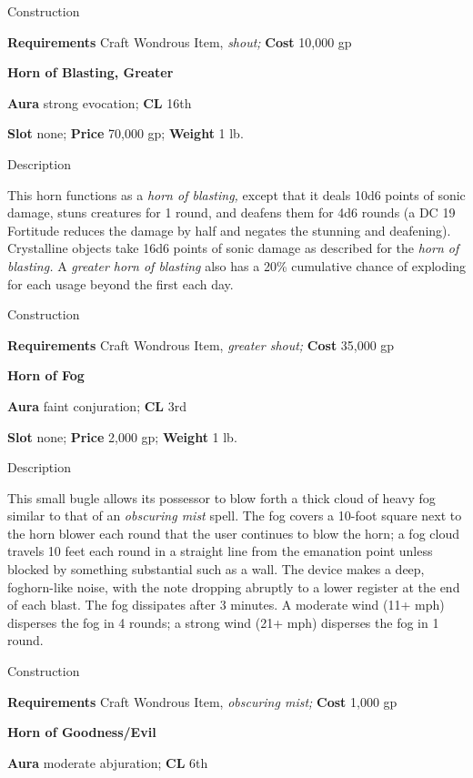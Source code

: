 Construction
				
\textbf{Requirements} Craft Wondrous Item,\textit{ shout;}\textbf{ Cost }10,000 gp
				
\textbf{Horn of Blasting, Greater}
				
\textbf{Aura} strong evocation;\textbf{ CL }16th
				
\textbf{Slot} none; \textbf{Price} 70,000 gp; \textbf{Weight} 1 lb.
				
Description
				
This horn functions as a \textit{horn of blasting,} except that it deals 10d6 points of sonic damage, stuns creatures for 1 round, and deafens them for 4d6 rounds (a DC 19 Fortitude reduces the damage by half and negates the stunning and deafening). Crystalline objects take 16d6 points of sonic damage as described for the \textit{horn of blasting.} A \textit{greater horn of blasting} also has a 20\% cumulative chance of exploding for each usage beyond the first each day. 
				
Construction
				
\textbf{Requirements} Craft Wondrous Item,\textit{ greater shout;}\textbf{ Cost }35,000 gp
				
\textbf{Horn of Fog}
				
\textbf{Aura} faint conjuration;\textbf{ CL }3rd
				
\textbf{Slot} none; \textbf{Price} 2,000 gp; \textbf{Weight} 1 lb.
				
Description
				
This small bugle allows its possessor to blow forth a thick cloud of heavy fog similar to that of an \textit{obscuring mist} spell. The fog covers a 10-foot square next to the horn blower each round that the user continues to blow the horn; a fog cloud travels 10 feet each round in a straight line from the emanation point unless blocked by something substantial such as a wall. The device makes a deep, foghorn-like noise, with the note dropping abruptly to a lower register at the end of each blast. The fog dissipates after 3 minutes. A moderate wind (11+ mph) disperses the fog in 4 rounds; a strong wind (21+ mph) disperses the fog in 1 round. 
				
Construction
				
\textbf{Requirements} Craft Wondrous Item,\textit{ obscuring mist;}\textbf{ Cost }1,000 gp
				
\textbf{Horn of Goodness/Evil}
				
\textbf{Aura} moderate abjuration;\textbf{ CL }6th
				
